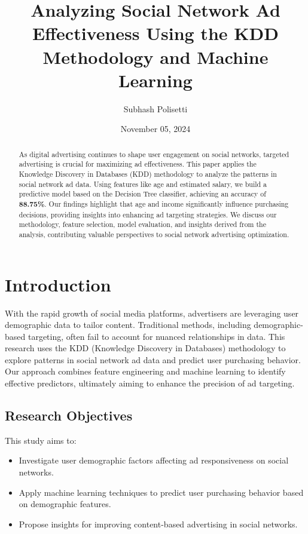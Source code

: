 \documentclass[12pt]{article}
\title{Analyzing Social Network Ad Effectiveness Using the KDD Methodology and Machine Learning}
\author{Subhash Polisetti}
\date{November 05, 2024}
\begin{document}
\maketitle

\begin{abstract}
As digital advertising continues to shape user engagement on social networks, targeted advertising is crucial for maximizing ad effectiveness. This paper applies the Knowledge Discovery in Databases (KDD) methodology to analyze the patterns in social network ad data. Using features like age and estimated salary, we build a predictive model based on the Decision Tree classifier, achieving an accuracy of \textbf{88.75\%}. Our findings highlight that age and income significantly influence purchasing decisions, providing insights into enhancing ad targeting strategies. We discuss our methodology, feature selection, model evaluation, and insights derived from the analysis, contributing valuable perspectives to social network advertising optimization.

\end{abstract}

\section{Introduction}
With the rapid growth of social media platforms, advertisers are leveraging user demographic data to tailor content. Traditional methods, including demographic-based targeting, often fail to account for nuanced relationships in data. This research uses the KDD (Knowledge Discovery in Databases) methodology to explore patterns in social network ad data and predict user purchasing behavior. Our approach combines feature engineering and machine learning to identify effective predictors, ultimately aiming to enhance the precision of ad targeting.

\subsection{Research Objectives}
This study aims to:
\begin{itemize}
    \item Investigate user demographic factors affecting ad responsiveness on social networks.
    \item Apply machine learning techniques to predict user purchasing behavior based on demographic features.
    \item Propose insights for improving content-based advertising in social networks.
\end{itemize}
\end{document}
